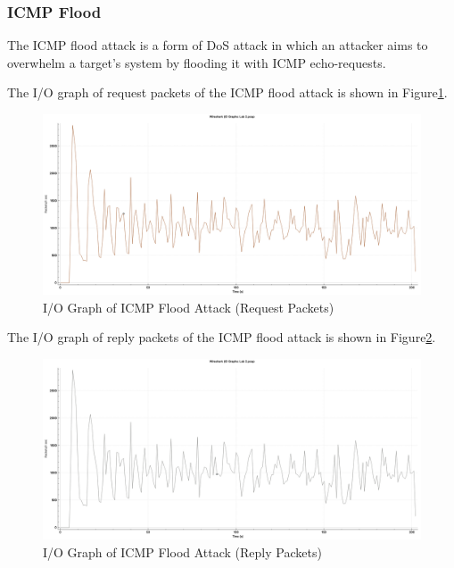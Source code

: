 \documentclass{article}
\begin{document}
    \subsubsection{ICMP Flood}\label{subsubsec:icmp-flood}
    The ICMP flood attack is a form of DoS attack in which an attacker aims to overwhelm a target's system by flooding it with ICMP echo-requests.

    The I/O graph of request packets of the ICMP flood attack is shown in Figure\ref{fig:icmp-flood-io-graph-request}.

    \begin{figure}[H]
        \centering
        \includegraphics[width=\textwidth]{image/131_icmp.png}
        \caption{I/O Graph of ICMP Flood Attack (Request Packets)}
        \label{fig:icmp-flood-io-graph-request}
    \end{figure}

    The I/O graph of reply packets of the ICMP flood attack is shown in Figure\ref{fig:icmp-flood-io-graph-reply}.

    \begin{figure}[H]
        \centering
        \includegraphics[width=\textwidth]{image/56_icmp.png}
        \caption{I/O Graph of ICMP Flood Attack (Reply Packets)}
        \label{fig:icmp-flood-io-graph-reply}
    \end{figure}
\end{document}
